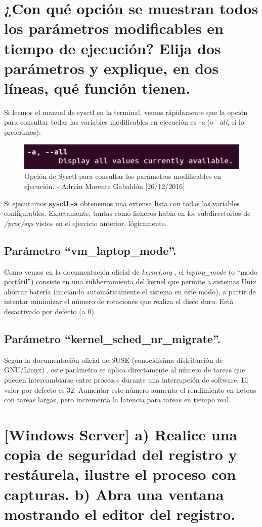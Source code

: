 \section{¿Con qué opción se muestran todos los parámetros modificables en tiempo de ejecución? Elija dos parámetros y explique, en dos líneas, qué función tienen.}
Si leemos el manual de sysctl en la terminal, vemos rápidamente que la opción para consultar todas las variables modificables en ejecución es \emph{-a} (o \emph{--all}, si lo preferimos):
\begin{figure}[H]
	\centering
	\includegraphics[scale=0.7]{sysctl-a}
	\caption{Opción de Sysctl para consultar los parámetros modificables en ejecución. - Adrián Morente Gabaldón [26/12/2016]}
	\label{figura2}
\end{figure}
Si ejecutamos \textbf{sysctl -a} obtenemos una extensa lista con todas las variables configurables. Exactamente, tantas como ficheros había en los subdirectorios de \emph{/proc/sys} vistos en el ejercicio anterior, lógicamente.
	\subsection{Parámetro ``vm\_laptop\_mode''.}
	Como vemos en la documentación oficial de \emph{kernel.org} \cite{kernel-laptop}, el \emph{laptop\_mode} (o ``modo portátil'') consiste en una subherramienta del kernel que permite a sistemas Unix ahorrar batería (iniciando automáticamente el sistema en este modo), a partir de intentar minimizar 	el número de rotaciones que realiza el disco duro. Está desactivado por defecto (a 0).
	\subsection{Parámetro ``kernel\_sched\_nr\_migrate''.}
	Según la documentación oficial de SUSE (conocidísima distribución de GNU/Linux) \cite{kernel-sched}, este parámetro se aplica directamente al número de tareas que pueden intercambiarse entre procesos durante una interrupción de software. El valor por defecto es 32. Aumentar este número aumenta el rendimiento en hebras con tareas largas, pero incrementa la latencia para tareas en tiempo real.


\section{[Windows Server] a) Realice una copia de seguridad del registro y restáurela, ilustre el proceso con capturas. b) Abra una ventana mostrando el editor del registro.}
